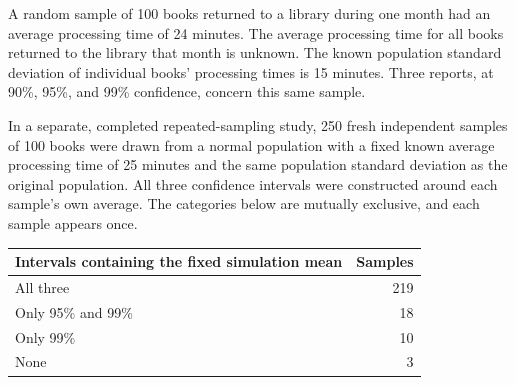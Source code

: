 \noindent\begin{minipage}[t]{0.70\linewidth}
\vspace{0pt}
A random sample of 100 books returned to a library during one month had an average processing time of 24 minutes. The average processing time for all books returned to the library that month is unknown. The known population standard deviation of individual books' processing times is 15 minutes. Three reports, at 90\%, 95\%, and 99\% confidence, concern this same sample.

In a separate, completed repeated-sampling study, 250 fresh independent samples of 100 books were drawn from a normal population with a fixed known average processing time of 25 minutes and the same population standard deviation as the original population. All three confidence intervals were constructed around each sample's own average. The categories below are mutually exclusive, and each sample appears once.
\end{minipage}\hfill
\begin{minipage}[t]{0.28\linewidth}
\vspace{0pt}
\centering
\small
\setlength{\tabcolsep}{4pt}
\begin{tabularx}{\linewidth}{@{}>{\raggedright\arraybackslash}Xr@{}}\toprule
Intervals containing the fixed simulation mean & Samples\\\midrule
All three & 219\\
Only 95\% and 99\% & 18\\
Only 99\% & 10\\
None & 3\\
\bottomrule\end{tabularx}
\end{minipage}\par


